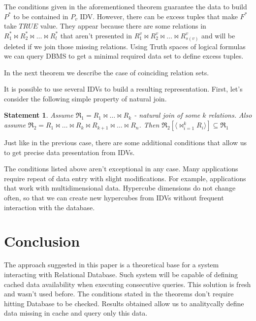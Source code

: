 \documentclass{article}
\newtheorem{statement}{Statement}
\def \n #1{\mathit{#1}}
\begin{document}


The conditions given in the aforementioned theorem guarantee the data to build
$P^{\ast}$ to be contained in $P_v$ IDV. However, there can be excess tuples that
make $F^{\ast}$
take $\n{TRUE}$ value. They appear because there are some relations in
$R^{\ast}_1 \Join R^{\ast}_2\Join \dots \Join R^{\ast}_l $ that aren't
presented in $R^v_1 \Join R^v_2 \Join \dots \Join R^v_{s(v)} $ and will be
deleted if we join those missing relations. Using Truth spaces of logical
formulas we can query DBMS to get a minimal required data set to define excess
tuples.

In the next theorem we describe the case of coinciding relation sets.



It is possible to use several IDVs to build a resulting representation. First,
let's consider the following simple property of natural join.

\begin{statement}
Assume $\Re_1 = R_1 \Join \dots \Join R_k$ - natural join of some $k$ relations.
Also assume $\Re_2 = R_1 \Join \dots \Join R_k \Join R_{k+1} \Join \dots \Join
R_{n}$. Then $\Re_2 [\langle \Join_{i=1}^{k} R_i \rangle] \subseteq \Re_1$
\label{join_property}
\end{statement}



Just like in the previous case, there are some additional conditions that allow
us to get precise data presentation from IDVs.



The conditions listed above aren't exceptional in any case. Many applications
require repeat of data entry with slight modifications. For example,
applications that
work with multidimensional data. Hypercube dimensions do not change often, so
that we can create new hypercubes from IDVs without frequent interaction with
the database. 

\section{Conclusion}
The approach suggested in this paper is a theoretical base for a system
interacting with Relational Database. Such system will be capable of defining
cached data availability when executing consecutive queries. This solution is
fresh and wasn't used before. The conditions stated in the theorems don't
require hitting Database to be checked. Results obtained allow us to
analitycally define data missing in cache and query only this data.
\end{document}

